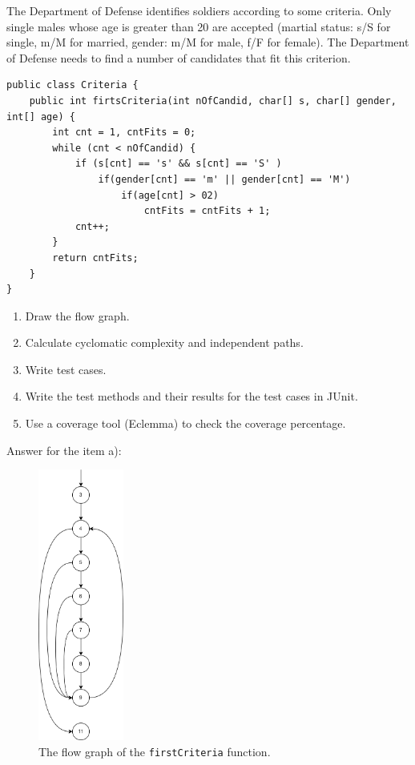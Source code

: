 \begin{exercise}
    The Department of Defense identifies soldiers according to some criteria. Only single males whose age is greater than 20 are accepted (martial status: s/S for single, m/M for married, gender: m/M for male, f/F for female). The Department of Defense needs to find a number of candidates that fit this criterion.
    
    \begin{lstlisting}[caption={Program for recruitment participation requirements of D.o.D..}]
public class Criteria {
    public int firtsCriteria(int nOfCandid, char[] s, char[] gender, int[] age) {
        int cnt = 1, cntFits = 0;
        while (cnt < nOfCandid) {
            if (s[cnt] == 's' && s[cnt] == 'S' )
                if(gender[cnt] == 'm' || gender[cnt] == 'M')
                    if(age[cnt] > 02)
                        cntFits = cntFits + 1;
            cnt++;
        }	
        return cntFits;
    }
}
    \end{lstlisting}
    
    \begin{enumerate}
        \item Draw the flow graph.
        \item Calculate cyclomatic complexity and independent paths.
        \item Write test cases.
        \item Write the test methods and their results for the test cases in JUnit.
        \item Use a coverage tool (Eclemma) to check the coverage percentage.
    \end{enumerate}
    
    Answer for the item a):
    
    \begin{figure}[H]
        \centering
        \includegraphics[width=0.25\textwidth]{images/exercise-8a-solution.png}
        \caption{The flow graph of the \lstinline!firstCriteria! function.}
        \label{fig:ex8-fg}
    \end{figure}
    

\end{exercise}
